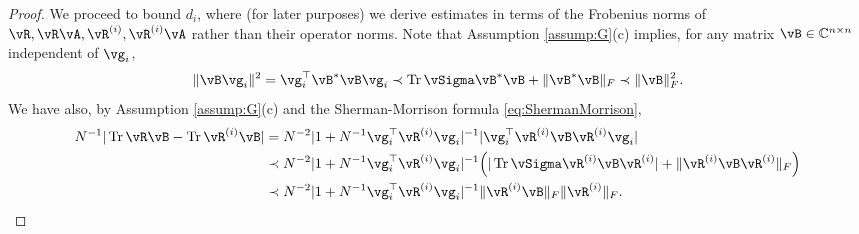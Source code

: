 \begin{proof}
We proceed to bound $d_i$, where (for later purposes)
we derive estimates in terms of the Frobenius norms of
$\vR,\vR\vA,\vR^{(i)},\vR^{(i)}\vA$ rather than their operator norms.
Note that Assumption \ref{assump:G}(c) implies, for any matrix
$\vB \in \C^{n \times n}$ independent of $\vg_i$,
\begin{equation}\label{eq:Agbound}
\|\vB\vg_i\|^2=\vg_i^\top \vB^*\vB \vg_i \prec
\Tr \vSigma\vB^*\vB+\|\vB^*\vB\|_F \prec \|\vB\|_F^2.
\end{equation}
We have also, by Assumption \ref{assump:G}(c) and the Sherman-Morrison
formula \eqref{eq:ShermanMorrison},
\begin{align}
N^{-1}|\Tr \vR\vB-\Tr \vR^{(i)}\vB|
&=N^{-2}|1+N^{-1}\vg_i^\top \vR^{(i)}\vg_i|^{-1}
|\vg_i^\top \vR^{(i)}\vB\vR^{(i)}\vg_i|\nonumber\\
&\prec N^{-2}|1+N^{-1}\vg_i^\top \vR^{(i)}\vg_i|^{-1}
\Big(|\Tr \vSigma\vR^{(i)}\vB\vR^{(i)}|+\|\vR^{(i)}\vB\vR^{(i)}\|_F\Big)\nonumber\\
&\prec N^{-2}|1+N^{-1}\vg_i^\top \vR^{(i)}\vg_i|^{-1}\|\vR^{(i)}\vB\|_F 
\|\vR^{(i)}\|_F.
\label{eq:mdiffestimate}
\end{align}


\end{proof}
